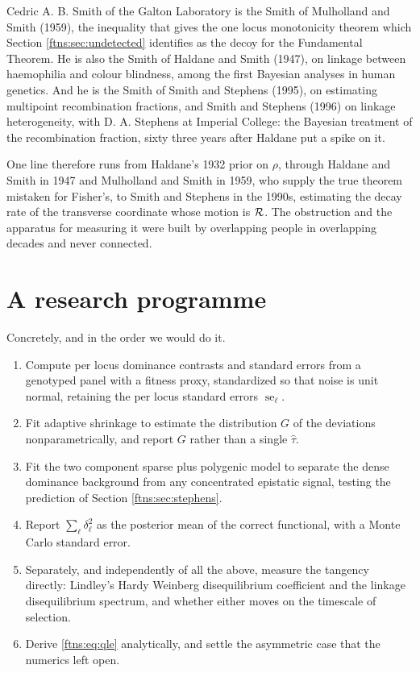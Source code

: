 Cedric A. B. Smith of the Galton Laboratory is the Smith of Mulholland and Smith (1959), the
inequality that gives the one locus monotonicity theorem which Section \ref{ftns:sec:undetected}
identifies as the decoy for the Fundamental Theorem. He is also the Smith of Haldane and Smith
(1947), on linkage between haemophilia and colour blindness, among the first Bayesian analyses in
human genetics. And he is the Smith of Smith and Stephens (1995), on estimating multipoint
recombination fractions, and Smith and Stephens (1996) on linkage heterogeneity, with D. A.
Stephens at Imperial College: the Bayesian treatment of the recombination fraction, sixty three
years after Haldane put a spike on it.

One line therefore runs from Haldane's 1932 prior on $\rho$, through Haldane and Smith in 1947 and
Mulholland and Smith in 1959, who supply the true theorem mistaken for Fisher's, to Smith and
Stephens in the 1990s, estimating the decay rate of the transverse coordinate whose motion is $\mathcal{R}$. The
obstruction and the apparatus for measuring it were built by overlapping people in overlapping
decades and never connected.

\section{A research programme}
\label{ftns:sec:programme}

Concretely, and in the order we would do it.

\begin{enumerate}
\item Compute per locus dominance contrasts and standard errors from a genotyped panel with a
fitness proxy, standardized so that noise is unit normal, retaining the per locus standard errors $\operatorname{se}_\ell$.
\item Fit adaptive shrinkage to estimate the distribution $G$ of the deviations nonparametrically,
and report $G$ rather than a single $\hat\tau$.
\item Fit the two component sparse plus polygenic model to separate the dense dominance background
from any concentrated epistatic signal, testing the prediction of Section \ref{ftns:sec:stephens}.
\item Report $\sum_\ell\delta^2_\ell$ as the posterior mean of the correct functional, with a
Monte Carlo standard error.
\item Separately, and independently of all the above, measure the tangency directly: Lindley's
Hardy Weinberg disequilibrium coefficient and the linkage disequilibrium spectrum, and whether
either moves on the timescale of selection.
\item Derive \eqref{ftns:eq:qle} analytically, and settle the asymmetric case that the numerics left
open.
\end{enumerate}

